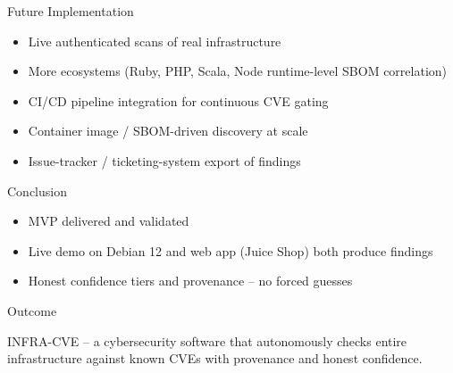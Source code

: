 \documentclass[11pt]{beamer}
\begin{document}
\begin{frame}{Future Implementation}
  \small
  \begin{itemize}
    \item Live authenticated scans of real infrastructure
    \item More ecosystems (Ruby, PHP, Scala, Node runtime-level SBOM correlation)
    \item CI/CD pipeline integration for continuous CVE gating
    \item Container image / SBOM-driven discovery at scale
    \item Issue-tracker / ticketing-system export of findings
  \end{itemize}
\end{frame}

\begin{frame}{Conclusion}
  \begin{itemize}
    \item MVP delivered and validated
    \item Live demo on Debian 12 and web app (Juice Shop) both produce findings
    \item Honest confidence tiers and provenance -- no forced guesses
  \end{itemize}
\end{frame}

\begin{frame}{Outcome}
  \begin{center}
    INFRA-CVE -- a cybersecurity software that autonomously checks entire
    infrastructure against known CVEs with provenance and honest confidence.
  \end{center}
\end{frame}
\end{document}
